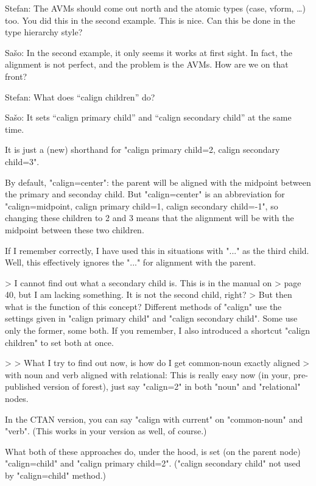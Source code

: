 \documentclass[output=book
		,modfonts
		,nonflat
	        ,collection
	        ,collectionchapter
	        ,collectiontoclongg
 	        ,biblatex  
                ,babelshorthands
                ,newtxmath
                ,colorlinks, citecolor=brown 
                ,draftmode
		  ]{langscibook}
\begin{document}
Stefan: The AVMs should come out north and the atomic types (case, vform, \ldots) too. You did this in
the second example. This is nice. Can this be done in the type hierarchy style?

Sašo: In the second example, it only seems it works at first sight. In fact, the alignment is not
perfect, and the problem is the AVMs.  How are we on that front?

Stefan: What does ``calign children'' do?

Sašo: It sets ``calign primary child'' and ``calign secondary child'' at the same time.

It is just a (new) shorthand for "calign primary child=2, calign
secondary child=3".

By default, "calign=center": the parent will be aligned with the
midpoint between the primary and seconday child. But "calign=center" is
an abbreviation for "calign=midpoint, calign primary child=1, calign
secondary child=-1", so changing these children to 2 and 3 means that the
alignment will be with the midpoint between these two children.

If I remember correctly, I have used this in situations with "..." as
the third child. Well, this effectively ignores the "..." for alignment
with the parent.


> I cannot find out what a secondary child is. This is in the manual on
> page 40, but I am lacking something. It is not the second child, right?
> But then what is the function of this concept?
Different methods of "calign" use the settings given in "calign primary
child" and "calign secondary child". Some use only the former, some
both. If you remember, I also introduced a shortcut "calign children" to
set both at once.

>
> What I try to find out now, is how do I get common-noun exactly aligned
> with noun and verb aligned with relational:
This is really easy now (in your, pre-published version of forest), just
say "calign=2" in both "noun" and "relational" nodes.

In the CTAN version, you can say "calign with current" on "common-noun"
and "verb". (This works in your version as well, of course.)

What both of these approaches do, under the hood, is set (on the parent
node) "calign=child" and "calign primary child=2". ("calign secondary
child" not used by "calign=child" method.)



\end{document}
